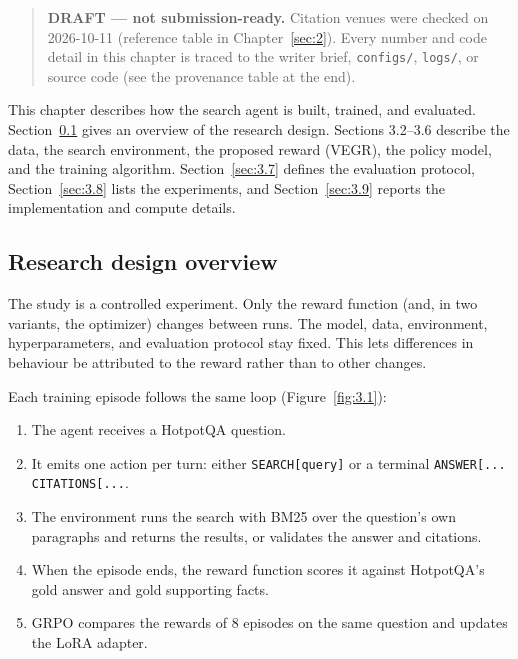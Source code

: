 
\begin{quote}
\textbf{DRAFT --- not submission-ready.} Citation venues were checked on
2026-10-11 (reference table in Chapter~\ref{sec:2}). Every number and
code detail in this chapter is traced to the writer brief,
\texttt{configs/\allowbreak{}}, \texttt{logs/\allowbreak{}}, or source
code (see the provenance table at the end).
\end{quote}

This chapter describes how the search agent is built, trained, and
evaluated. Section~\ref{sec:3.1} gives an overview of the research
design. Sections 3.2--3.6 describe the data, the search environment, the
proposed reward (VEGR), the policy model, and the training algorithm.
Section~\ref{sec:3.7} defines the evaluation protocol,
Section~\ref{sec:3.8} lists the experiments, and Section~\ref{sec:3.9}
reports the implementation and compute details.

\subsection{Research design overview}\label{sec:3.1}

The study is a controlled experiment. Only the reward function (and, in
two variants, the optimizer) changes between runs. The model, data,
environment, hyperparameters, and evaluation protocol stay fixed. This
lets differences in behaviour be attributed to the reward rather than to
other changes.

Each training episode follows the same loop (Figure~\ref{fig:3.1}):

\begin{enumerate}
\def\labelenumi{\arabic{enumi}.}
\tightlist
\item
  The agent receives a HotpotQA question.
\item
  It emits one action per turn: either
  \texttt{SEARCH{[}\allowbreak{}query{]}} or a terminal
  \texttt{ANSWER{[}\allowbreak{}.\allowbreak{}.\allowbreak{}.\allowbreak{}{]} CITATIONS{[}\allowbreak{}.\allowbreak{}.\allowbreak{}.\allowbreak{}{]}}.
\item
  The environment runs the search with BM25 over the question's own
  paragraphs and returns the results, or validates the answer and
  citations.
\item
  When the episode ends, the reward function scores it against
  HotpotQA's gold answer and gold supporting facts.
\item
  GRPO compares the rewards of 8 episodes on the same question and
  updates the LoRA adapter.
\end{enumerate}

